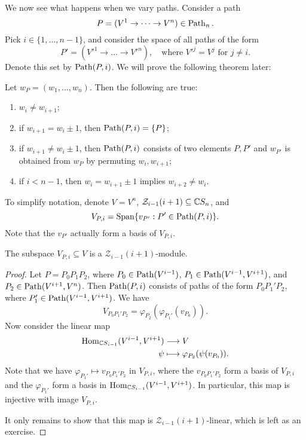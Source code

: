 \begin{remark}
  We now see what happens when we
  vary paths. Consider a path
  \[P = (V^1 \to \dots \to V^n) \in \operatorname{Path}_n.\]
  Pick $i \in \{1, \ldots, n - 1\}$, and
  consider the space of all paths
  of the form
  \[
    P' = (V'^1 \to \dots \to V'^n),
    \quad \text{where } V'^j = V^j
    \text{ for } j \ne i.
  \]
  Denote this set by $\operatorname{Path}(P, i)$.
  We will prove the following theorem later:
\end{remark}

\begin{theorem}
  Let $w_P = (w_1, \dots, w_n)$. Then
  the following are true:
  \begin{enumerate}
    \item $w_i \ne w_{i + 1}$;
    \item if $w_{i + 1} = w_i \pm 1$, then
      $\operatorname{Path}(P, i) = \{P\}$;
    \item if $w_{i + 1} \ne w_i \pm 1$, then
      $\operatorname{Path}(P, i)$ consists of
      two elements $P, P'$ and
      $w_{P'}$ is obtained from
      $w_P$ by permuting
      $w_i, w_{i + 1}$;
    \item if $i < n - 1$, then
      $w_i = w_{i + 1} \pm 1$ implies
      $w_{i + 2} \ne w_i$.
  \end{enumerate}
\end{theorem}

\begin{remark}
  To simplify notation, denote
  $V = V^n$, $\mathcal{Z}_{i - 1}(i + 1) \subseteq \mathbb{C} S_n$, and
  \[
    V_{P, i} = \operatorname{Span}\{v_{P'} : P' \in \operatorname{Path}(P, i)\}.
  \]
  Note that
  the $v_{P'}$ actually form a basis of
  $V_{P, i}$.
\end{remark}

\begin{prop}
  The subspace $V_{P, i} \subseteq V$
  is a $\mathcal{Z}_{i - 1}(i + 1)$-module.
\end{prop}

\begin{proof}
  Let $P = P_0 P_1 P_2$, where
  $P_0 \in \operatorname{Path}(V^{i - 1})$,
  $P_1 \in \operatorname{Path}(V^{i - 1}, V^{i + 1})$,
  and $P_2 \in \operatorname{Path}(V^{i + 1}, V^n)$.
  Then
  $\operatorname{Path}(P, i)$ consists of paths of
  the form $P_0 P_1' P_2$,
  where $P_1' \in \operatorname{Path}(V^{i - 1}, V^{i + 1})$.
  We have
  \[
    V_{P_0 P_1' P_2}
    = \varphi_{P_2}(\varphi_{P_1'}(v_{P_0})).
  \]
  Now consider the linear map
  \begin{align*}
    \operatorname{Hom}_{\mathbb{C} S_{i - 1}}(V^{i - 1}, V^{i + 1})
    &\longrightarrow V \\
    \psi &\longmapsto \varphi_{P_2}(\psi(v_{P_0})).
  \end{align*}
  Note that we have $\varphi_{P_1'} \mapsto v_{P_0 P_1' P_2}$
  in $V_{P, i}$, where the
  $v_{P_0 P_1' P_2}$ form a basis of
  $V_{P, i}$
  and the $\varphi_{P_1'}$ form a basis
  in $\operatorname{Hom}_{\mathbb{C} S_{i - 1}}(V^{i - 1}, V^{i + 1})$.
  In particular, this map is
  injective with image $V_{P, i}$.

  It only remains to show that this map
  is $\mathcal{Z}_{i - 1}(i + 1)$-linear,
  which is left as an exercise.
\end{proof}


